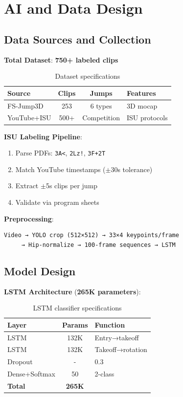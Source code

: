 \section{AI and Data Design}
\label{section:ai-data-design}

\subsection{Data Sources and Collection}

\textbf{Total Dataset}: \textbf{750+ labeled clips}

\begin{table}[htbp]
\centering
\begin{tabular}{|l|c|c|p{3cm}|}
\hline
\textbf{Source} & \textbf{Clips} & \textbf{Jumps} & \textbf{Features} \\
\hline
FS-Jump3D & 253 & 6 types & 3D mocap \\
YouTube+ISU & 500+ & Competition & ISU protocols \\
\hline
\end{tabular}
\caption{Dataset specifications}
\label{tab:datasets}
\end{table}

\textbf{ISU Labeling Pipeline}:
\begin{enumerate}
\item Parse PDFs: \texttt{3A<}, \texttt{2Lz!}, \texttt{3F+2T}
\item Match YouTube timestamps ($\pm$30s tolerance)
\item Extract $\pm$5s clips per jump
\item Validate via program sheets
\end{enumerate}

\textbf{Preprocessing}:
\begin{verbatim}
Video → YOLO crop (512×512) → 33×4 keypoints/frame 
     → Hip-normalize → 100-frame sequences → LSTM
\end{verbatim}

\subsection{Model Design}

\textbf{LSTM Architecture} (\textbf{265K parameters}):

\begin{table}[htbp]
\centering
\begin{tabular}{|l|c|l|}
\hline
\textbf{Layer} & \textbf{Params} & \textbf{Function} \\
\hline
LSTM & 132K & Entry→takeoff \\
LSTM & 132K & Takeoff→rotation \\
Dropout & - & 0.3 \\
Dense+Softmax & 50 & 2-class \\
\hline
\textbf{Total} & \textbf{265K} & \\
\hline
\end{tabular}
\caption{LSTM classifier specifications}
\label{tab:lstm}
\end{table}

